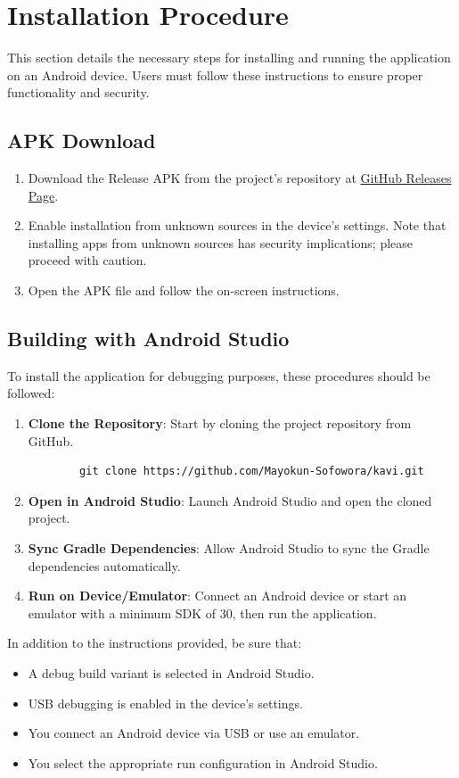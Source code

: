 \section{Installation Procedure}
This section details the necessary steps for installing and running the application on an Android device. Users must follow these instructions to ensure proper functionality and security.

\subsection{APK Download}
\begin{enumerate}
    \item Download the Release APK from the project's repository at \href{https://github.com/Mayokun-Sofowora/kavi/releases/download/v1.0.0/app-release.apk}{GitHub Releases Page}.
    \item Enable installation from unknown sources in the device's settings. Note that installing apps from unknown sources has security implications; please proceed with caution.
    \item Open the APK file and follow the on-screen instructions.
\end{enumerate}

\subsection{Building with Android Studio}
To install the application for debugging purposes, these procedures should be followed:
\begin{enumerate}
    \item \textbf{Clone the Repository}: Start by cloning the project repository from GitHub.
    \begin{verbatim}
        git clone https://github.com/Mayokun-Sofowora/kavi.git
    \end{verbatim}
    \item \textbf{Open in Android Studio}: Launch Android Studio and open the cloned project.
    \item \textbf{Sync Gradle Dependencies}: Allow Android Studio to sync the Gradle dependencies automatically.
    \item \textbf{Run on Device/Emulator}: Connect an Android device or start an emulator with a minimum SDK of 30, then run the application.
\end{enumerate}

In addition to the instructions provided, be sure that:
\begin{itemize}
    \item  A debug build variant is selected in Android Studio.
    \item USB debugging is enabled in the device's settings.
    \item You connect an Android device via USB or use an emulator.
    \item  You select the appropriate run configuration in Android Studio.
\end{itemize}

